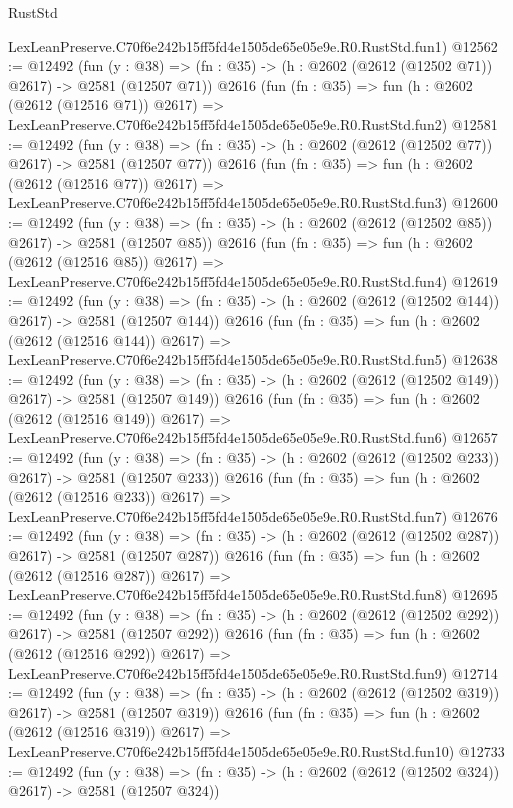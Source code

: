 \begin{lexlean}{RustStd}
\begin{coremodule}
    LexLeanPreserve.C70f6e242b15ff5fd4e1505de65e05e9e.R0.RustStd.fun1)
@12562 := @12492
    (fun (y : @38) => (fn : @35) -> (h : @2602 (@2612 (@12502 @71)) @2617) -> @2581 (@12507 @71))
    @2616
    (fun (fn : @35) =>
    fun (h : @2602 (@2612 (@12516 @71)) @2617) =>
    LexLeanPreserve.C70f6e242b15ff5fd4e1505de65e05e9e.R0.RustStd.fun2)
@12581 := @12492
    (fun (y : @38) => (fn : @35) -> (h : @2602 (@2612 (@12502 @77)) @2617) -> @2581 (@12507 @77))
    @2616
    (fun (fn : @35) =>
    fun (h : @2602 (@2612 (@12516 @77)) @2617) =>
    LexLeanPreserve.C70f6e242b15ff5fd4e1505de65e05e9e.R0.RustStd.fun3)
@12600 := @12492
    (fun (y : @38) => (fn : @35) -> (h : @2602 (@2612 (@12502 @85)) @2617) -> @2581 (@12507 @85))
    @2616
    (fun (fn : @35) =>
    fun (h : @2602 (@2612 (@12516 @85)) @2617) =>
    LexLeanPreserve.C70f6e242b15ff5fd4e1505de65e05e9e.R0.RustStd.fun4)
@12619 := @12492
    (fun (y : @38) => (fn : @35) -> (h : @2602 (@2612 (@12502 @144)) @2617) -> @2581 (@12507 @144))
    @2616
    (fun (fn : @35) =>
    fun (h : @2602 (@2612 (@12516 @144)) @2617) =>
    LexLeanPreserve.C70f6e242b15ff5fd4e1505de65e05e9e.R0.RustStd.fun5)
@12638 := @12492
    (fun (y : @38) => (fn : @35) -> (h : @2602 (@2612 (@12502 @149)) @2617) -> @2581 (@12507 @149))
    @2616
    (fun (fn : @35) =>
    fun (h : @2602 (@2612 (@12516 @149)) @2617) =>
    LexLeanPreserve.C70f6e242b15ff5fd4e1505de65e05e9e.R0.RustStd.fun6)
@12657 := @12492
    (fun (y : @38) => (fn : @35) -> (h : @2602 (@2612 (@12502 @233)) @2617) -> @2581 (@12507 @233))
    @2616
    (fun (fn : @35) =>
    fun (h : @2602 (@2612 (@12516 @233)) @2617) =>
    LexLeanPreserve.C70f6e242b15ff5fd4e1505de65e05e9e.R0.RustStd.fun7)
@12676 := @12492
    (fun (y : @38) => (fn : @35) -> (h : @2602 (@2612 (@12502 @287)) @2617) -> @2581 (@12507 @287))
    @2616
    (fun (fn : @35) =>
    fun (h : @2602 (@2612 (@12516 @287)) @2617) =>
    LexLeanPreserve.C70f6e242b15ff5fd4e1505de65e05e9e.R0.RustStd.fun8)
@12695 := @12492
    (fun (y : @38) => (fn : @35) -> (h : @2602 (@2612 (@12502 @292)) @2617) -> @2581 (@12507 @292))
    @2616
    (fun (fn : @35) =>
    fun (h : @2602 (@2612 (@12516 @292)) @2617) =>
    LexLeanPreserve.C70f6e242b15ff5fd4e1505de65e05e9e.R0.RustStd.fun9)
@12714 := @12492
    (fun (y : @38) => (fn : @35) -> (h : @2602 (@2612 (@12502 @319)) @2617) -> @2581 (@12507 @319))
    @2616
    (fun (fn : @35) =>
    fun (h : @2602 (@2612 (@12516 @319)) @2617) =>
    LexLeanPreserve.C70f6e242b15ff5fd4e1505de65e05e9e.R0.RustStd.fun10)
@12733 := @12492
    (fun (y : @38) => (fn : @35) -> (h : @2602 (@2612 (@12502 @324)) @2617) -> @2581 (@12507 @324))

\end{coremodule}
\end{lexlean}
